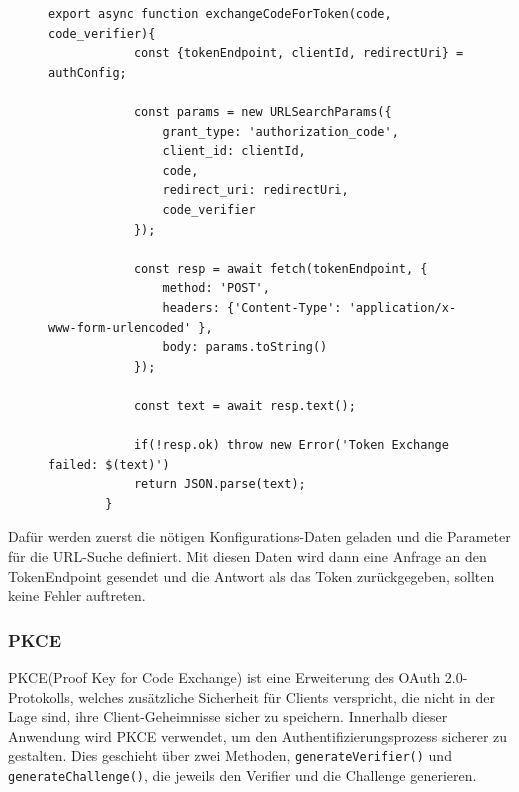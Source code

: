 \begin{figure}[H]
    \begin{lstlisting}[caption=ExchangeCodeForToken Methode, label=list:exchangecodefortoken]
        export async function exchangeCodeForToken(code, code_verifier){
            const {tokenEndpoint, clientId, redirectUri} = authConfig;

            const params = new URLSearchParams({
                grant_type: 'authorization_code',
                client_id: clientId,
                code,
                redirect_uri: redirectUri,
                code_verifier
            });

            const resp = await fetch(tokenEndpoint, {
                method: 'POST',
                headers: {'Content-Type': 'application/x-www-form-urlencoded' },
                body: params.toString()
            });

            const text = await resp.text();

            if(!resp.ok) throw new Error('Token Exchange failed: $(text)')
            return JSON.parse(text);
        }
    \end{lstlisting}
\end{figure}
Dafür werden zuerst die nötigen Konfigurations-Daten geladen und die Parameter für die URL-Suche definiert. Mit diesen Daten wird dann 
eine Anfrage an den TokenEndpoint gesendet und die Antwort als das Token zurückgegeben, sollten keine Fehler auftreten.
\subsubsection{PKCE}
PKCE(Proof Key for Code Exchange) ist eine Erweiterung des OAuth 2.0-Protokolls, welches zusätzliche Sicherheit für Clients verspricht,
die nicht in der Lage sind, ihre Client-Geheimnisse sicher zu speichern.
Innerhalb dieser Anwendung wird PKCE verwendet, um den Authentifizierungsprozess sicherer zu gestalten. Dies geschieht über zwei Methoden,
\texttt{generateVerifier()} und \texttt{generateChallenge()}, die jeweils den Verifier und die Challenge generieren. \break

